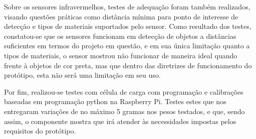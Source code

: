 Sobre os sensores infravermelhos, testes de adequação foram também realizados, visando questões práticas como distância mínima para ponto de interesse de detecção e tipos de materiais suportados pelo sensor. Como resultado dos testes, constatou-se que os sensores funcionam em detecção de objetos a distâncias suficientes em termos do projeto em questão, e em sua única limitação quanto a tipos de materiais, o sensor mostrou não funcionar de maneira ideal quando frente à objetos de cor preta, mas que dentro das diretrizes de funcionamento do protótipo, esta não será uma limitação em seu uso.

Por fim, realizou-se testes com célula de carga com programação e calibrações baseadas em programação python na Raspberry Pi. Testes estes que nos entregaram variações de no máximo 5 gramas nos pesos testados, e que, sendo assim, o componente mostra que irá atender às necessidades impostas pelos requisitos do protótipo.


